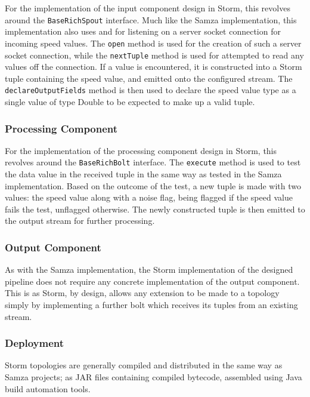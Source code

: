 For the implementation of the input component design in Storm, this revolves around the \texttt{BaseRichSpout} interface.
Much like the Samza implementation, this implementation also uses  and 
for listening on a server socket connection for incoming speed values. The \texttt{open} method is used for the creation
of such a server socket connection, while the \texttt{nextTuple} method is used for attempted to read any values off the
connection. If a value is encountered, it is constructed into a Storm tuple containing the speed value, and emitted onto
the configured stream. The \texttt{declareOutputFields} method is then used to declare the speed value type as a single
value of type Double to be expected to make up a valid tuple.

\subsubsection{Processing Component}

For the implementation of the processing component design in Storm, this revolves around the \texttt{BaseRichBolt} interface.
The \texttt{execute} method is used to test the data value in the received tuple in the same way as tested in the Samza
implementation. Based on the outcome of the test, a new tuple is made with two values: the speed value along with a
noise flag, being flagged if the speed value fails the test, unflagged otherwise. The newly constructed tuple is then
emitted to the output stream for further processing.

\subsubsection{Output Component}

As with the Samza implementation, the Storm implementation of the designed pipeline does not require any concrete implementation
of the output component. This is as Storm, by design, allows any extension to be made to a topology simply by implementing
a further bolt which receives its tuples from an existing stream.

\subsubsection{Deployment}

Storm topologies are generally compiled and distributed in the same way as Samza projects; as JAR files containing compiled
bytecode, assembled using Java build automation tools.

